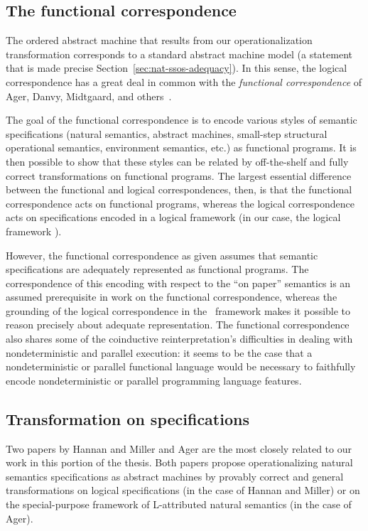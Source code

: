 \subsection*{The functional correspondence}

The ordered abstract machine that results from our operationalization
transformation corresponds to a standard abstract machine model (a
statement that is made precise
Section~\ref{sec:nat-ssos-adequacy}). In this sense, the logical
correspondence has a great deal in common with the {\it functional
  correspondence} of Ager, Danvy, Midtgaard, and
others~\cite{ager03functional,ager04functional,ager05functional,
  danvy08defunctionalized,danvy12interderiving}. 

The goal of the functional correspondence is to encode various styles
of semantic specifications (natural semantics, abstract machines,
small-step structural operational semantics, environment semantics,
etc.) as functional programs. It is then possible to show that these
styles can be related by off-the-shelf and fully correct
transformations on functional programs. The largest essential
difference between the functional and logical correspondences, then,
is that the functional correspondence acts on functional programs,
whereas the logical correspondence acts on specifications encoded in a
logical framework (in our case, the logical framework \sls).

However, the functional correspondence as given assumes that semantic
specifications are adequately represented as functional programs. The
correspondence of this encoding with respect to the ``on paper''
semantics is an assumed prerequisite in work on the functional
correspondence, whereas the grounding of the logical correspondence in
the \sls~framework makes it possible to reason precisely about
adequate representation. The functional correspondence also shares
some of the coinductive reinterpretation's difficulties in dealing
with nondeterministic and parallel execution: it seems to be the case
that a nondeterministic or parallel functional language would be
necessary to faithfully encode nondeterministic or parallel programming
language features.

\subsection*{Transformation on specifications}

Two papers by Hannan and Miller \cite{hannan92operational} and Ager
\cite{ager04natural} are the most closely related to our work in this
portion of the thesis. Both papers propose operationalizing natural
semantics specifications as abstract machines by provably correct and
general transformations on logical specifications (in the case of
Hannan and Miller) or on the special-purpose framework of L-attributed
natural semantics (in the case of Ager).

